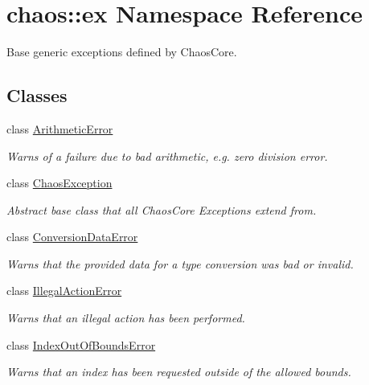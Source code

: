 \hypertarget{namespacechaos_1_1ex}{}\section{chaos\+:\+:ex Namespace Reference}
\label{namespacechaos_1_1ex}


Base generic exceptions defined by Chaos\+Core.  


\subsection*{Classes}
\begin{DoxyCompactItemize}
\item 
class \hyperlink{classchaos_1_1ex_1_1_arithmetic_error}{Arithmetic\+Error}
\begin{DoxyCompactList}\small\item\em Warns of a failure due to bad arithmetic, e.\+g. zero division error. \end{DoxyCompactList}\item 
class \hyperlink{classchaos_1_1ex_1_1_chaos_exception}{Chaos\+Exception}
\begin{DoxyCompactList}\small\item\em Abstract base class that all Chaos\+Core Exceptions extend from. \end{DoxyCompactList}\item 
class \hyperlink{classchaos_1_1ex_1_1_conversion_data_error}{Conversion\+Data\+Error}
\begin{DoxyCompactList}\small\item\em Warns that the provided data for a type conversion was bad or invalid. \end{DoxyCompactList}\item 
class \hyperlink{classchaos_1_1ex_1_1_illegal_action_error}{Illegal\+Action\+Error}
\begin{DoxyCompactList}\small\item\em Warns that an illegal action has been performed. \end{DoxyCompactList}\item 
class \hyperlink{classchaos_1_1ex_1_1_index_out_of_bounds_error}{Index\+Out\+Of\+Bounds\+Error}
\begin{DoxyCompactList}\small\item\em Warns that an index has been requested outside of the allowed bounds. \end{DoxyCompactList}\item 

\end{DoxyCompactItemize}
